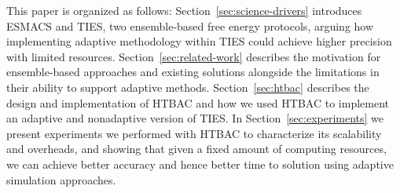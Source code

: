 This paper is organized as follows: Section~\ref{sec:science-drivers}
introduces ESMACS and TIES, two ensemble-based free energy protocols, arguing
how implementing adaptive methodology within TIES could achieve higher
precision with limited resources. Section~\ref{sec:related-work} describes
the motivation for ensemble-based approaches and existing solutions alongside
the limitations in their ability to support adaptive methods.
Section~\ref{sec:htbac} describes the design and implementation of HTBAC and
how we used HTBAC to implement an adaptive and nonadaptive version of TIES. In 
Section~\ref{sec:experiments} we present experiments we 
performed with HTBAC to characterize its scalability and overheads, and showing 
that given a fixed amount of computing resources, we can achieve better accuracy 
and hence better time to solution using adaptive simulation approaches.






